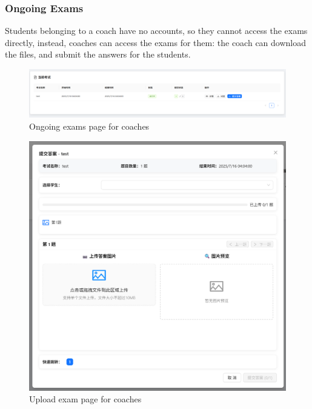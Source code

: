 \documentclass[12pt]{article}
\begin{document}
\subsubsection{Ongoing Exams}
Students belonging to a coach have no accounts, so they cannot access the exams directly, instead, coaches can access the exams
for them: the coach can download the files, and submit the answers for the students.
\begin{figure}[H]
    \centering
    \includegraphics[width=\textwidth]{coach/test-ing.png}
    \caption{Ongoing exams page for coaches}
    \label{fig:OngoingExamsForCoach page}
\end{figure}
\begin{figure}[H]
    \centering
    \includegraphics[width=\textwidth]{coach/uploadexam.png}
    \caption{Upload exam page for coaches}
    \label{fig:UploadExamForCoach page}
\end{figure}
\end{document}
